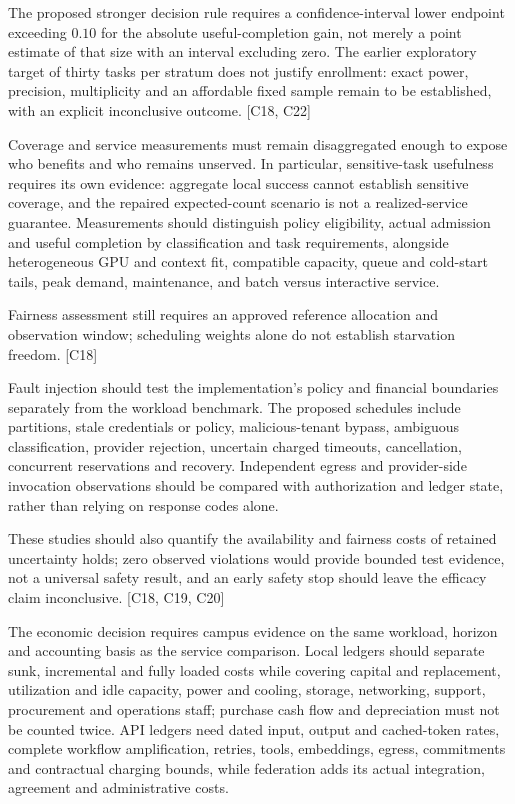 \documentclass[11pt]{article}
\begin{document}
The proposed stronger decision rule requires a confidence-interval lower endpoint exceeding $0.10$ for the absolute useful-completion gain, not merely a point estimate of that size with an interval excluding zero. The earlier exploratory target of thirty tasks per stratum does not justify enrollment: exact power, precision, multiplicity and an affordable fixed sample remain to be established, with an explicit inconclusive outcome. [C18, C22]

Coverage and service measurements must remain disaggregated enough to expose who benefits and who remains unserved. In particular, sensitive-task usefulness requires its own evidence: aggregate local success cannot establish sensitive coverage, and the repaired expected-count scenario is not a realized-service guarantee. Measurements should distinguish policy eligibility, actual admission and useful completion by classification and task requirements, alongside heterogeneous GPU and context fit, compatible capacity, queue and cold-start tails, peak demand, maintenance, and batch versus interactive service.

Fairness assessment still requires an approved reference allocation and observation window; scheduling weights alone do not establish starvation freedom. [C18]

Fault injection should test the implementation\textquoteright{}s policy and financial boundaries separately from the workload benchmark. The proposed schedules include partitions, stale credentials or policy, malicious-tenant bypass, ambiguous classification, provider rejection, uncertain charged timeouts, cancellation, concurrent reservations and recovery. Independent egress and provider-side invocation observations should be compared with authorization and ledger state, rather than relying on response codes alone.

These studies should also quantify the availability and fairness costs of retained uncertainty holds; zero observed violations would provide bounded test evidence, not a universal safety result, and an early safety stop should leave the efficacy claim inconclusive. [C18, C19, C20]

The economic decision requires campus evidence on the same workload, horizon and accounting basis as the service comparison. Local ledgers should separate sunk, incremental and fully loaded costs while covering capital and replacement, utilization and idle capacity, power and cooling, storage, networking, support, procurement and operations staff; purchase cash flow and depreciation must not be counted twice. API ledgers need dated input, output and cached-token rates, complete workflow amplification, retries, tools, embeddings, egress, commitments and contractual charging bounds, while federation adds its actual integration, agreement and administrative costs.
\end{document}

